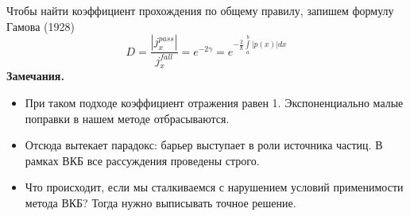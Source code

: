 Чтобы найти коэффициент прохождения по общему правилу, запишем формулу Гамова (1928)
$$
\boxed{
    D = \dfrac{|j_x^{pass}|}{j_x^{fall}} = e^{-2 \gamma} = e^{-\frac{2}{\hbar} \int\limits_a^b |p(x)| dx} 
}
$$
\textbf{Замечания.}
\begin{itemize}
  \item При таком подходе коэффициент отражения равен 1. Экспоненциально малые поправки в нашем методе отбрасываются.
  \item Отсюда вытекает парадокс: барьер выступает в роли источника частиц. В рамках ВКБ все рассуждения проведены строго.
  \item Что происходит, если мы сталкиваемся с нарушением условий применимости метода ВКБ? Тогда нужно выписывать точное решение.
\end{itemize}
